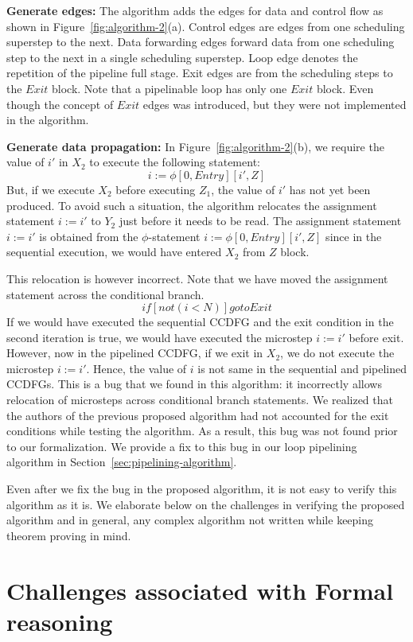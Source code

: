 {\bf Generate edges:} The algorithm adds the edges for data and control flow as shown in Figure~\ref{fig:algorithm-2}(a). Control edges are edges from one scheduling superstep to the next. Data forwarding edges forward data from one scheduling step to the next in a single scheduling superstep. Loop edge denotes the repetition of the pipeline full stage. Exit edges are from the scheduling steps to the $Exit$ block. Note that a pipelinable loop has only one $Exit$ block. Even though the concept of $Exit$ edges was introduced, but they were not implemented in the algorithm.

{\bf Generate data propagation:} In Figure~\ref{fig:algorithm-2}(b), we require the value of $i'$ in $X_2$ to execute the following statement:
$$ i := \phi [0, Entry][i', Z]$$
But, if we execute $X_2$ before executing $Z_1$, the value of $i'$ has not yet been produced. To avoid such a situation, the algorithm relocates the assignment statement $i := i'$ to $Y_2$ just before it needs to be read. The assignment statement $i := i'$ is obtained from the $\phi$-statement $i := \phi [0, Entry][i', Z]$ since in the sequential execution, we would have entered $X_2$ from $Z$ block.

This relocation is however incorrect. Note that we have moved the assignment statement across the conditional branch. $$ if [not (i<N)] goto Exit $$ If we would have executed the sequential CCDFG and the exit condition in the second iteration is true, we would have executed the microstep $i := i'$ before exit. However, now in the pipelined CCDFG, if we exit in $X_2$, we do not execute the microstep $i := i'$. Hence, the value of $i$ is not same in the sequential and pipelined CCDFGs. This is a bug that we found in this algorithm: it incorrectly allows relocation of microsteps across conditional branch statements.
We realized that the authors of the previous proposed algorithm had not accounted for the exit conditions while testing the algorithm. As a result, this bug was not found prior to our formalization. We provide a fix to this bug in our loop pipelining algorithm in Section~\ref{sec:pipelining-algorithm}.

Even after we fix the bug in the proposed algorithm, it is not easy to verify this algorithm as it is.
We elaborate below on the challenges
in verifying the proposed algorithm and in general, any complex algorithm not written while keeping theorem proving in mind.

\section{Challenges associated with Formal reasoning}

